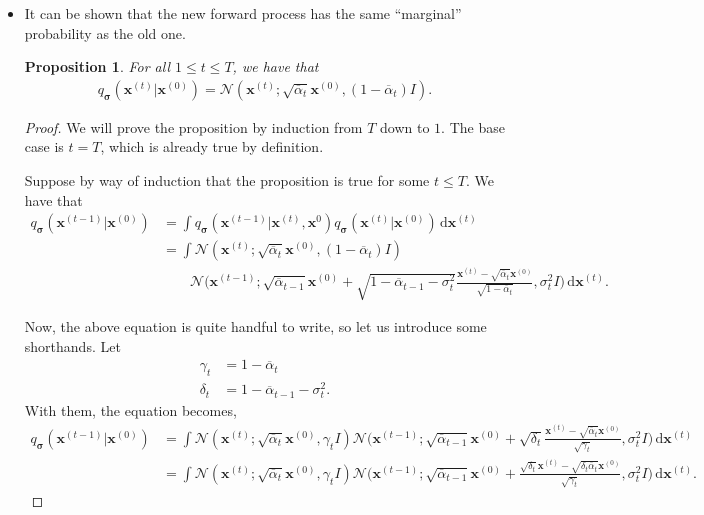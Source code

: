 \documentclass[10pt]{article}
\newtheorem{proposition}[lemma]{Proposition}
\newcommand{\dee}{\mathrm{d}}
\newcommand{\ve}[1]{\mathbf{#1}}
\newcommand{\ves}[1]{\boldsymbol{#1}}
\newcommand{\mcal}[1]{\mathcal{#1}}
\begin{document}
\begin{itemize}
  \item It can be shown that the new forward process has the same ``marginal'' probability as the old one.
  \begin{proposition}
    For all $1 \leq t \leq T$, we have that
    \begin{align*}
      q_{\ves{\sigma}}(\ve{x}^{(t)}|\ve{x}^{(0)}) = \mcal{N}(\ve{x}^{(t)}; \sqrt{\overline{\alpha}_t} \ve{x}^{(0)}, (1-\overline{\alpha}_t) I).
    \end{align*}
  \end{proposition}

  \begin{proof}
    We will prove the proposition by induction from $T$ down to $1$. The base case is $t = T$, which is already true by definition.

    Suppose by way of induction that the proposition is true for some $t \leq T$. We have that
    \begin{align*}
      q_{\ves{\sigma}}(\ve{x}^{(t-1)}|\ve{x}^{(0)}) 
      &= \int q_{\ves{\sigma}}(\ve{x}^{(t-1)}|\ve{x}^{(t)}, \ve{x}^{0}) q_{\ves{\sigma}}(\ve{x}^{(t)}|\ve{x}^{(0)})\, \dee\ve{x}^{(t)} \\
      &= \int \mcal{N}(\ve{x}^{(t)}; \sqrt{\overline{\alpha}_t} \ve{x}^{(0)}, (1-\overline{\alpha}_t) I) \\
      & \qquad \mcal{N}\bigg( \ve{x}^{(t-1)} ; \sqrt{\overline{\alpha}_{t-1}} \ve{x}^{(0)} + \sqrt{1 - \overline{\alpha}_{t-1} - \sigma_t^2 } \frac{\ve{x}^{(t)} - \sqrt{\overline{\alpha}_t} \ve{x}^{(0)}}{\sqrt{1 - \overline{\alpha}_t}}, \sigma_t^2 I \bigg)\, \dee\ve{x}^{(t)}.
    \end{align*}

    Now, the above equation is quite handful to write, so let us introduce some shorthands. Let
    \begin{align*}
      \gamma_t &= 1 - \overline{\alpha}_t \\
      \delta_t &= 1 - \overline{\alpha}_{t-1} - \sigma_t^2.
    \end{align*}
    With them, the equation becomes,
    \begin{align*}
      q_{\ves{\sigma}}(\ve{x}^{(t-1)}|\ve{x}^{(0)}) 
      &= \int \mcal{N}(\ve{x}^{(t)}; \sqrt{\overline{\alpha}_t} \ve{x}^{(0)}, \gamma_t I)
      \mcal{N}\bigg(\ve{x}^{(t-1)};\sqrt{\overline{\alpha}_{t-1}} \ve{x}^{(0)} + \sqrt{\delta_t}\frac{\ve{x}^{(t)} - \sqrt{\overline{\alpha}_t}\ve{x}^{(0)}}{\sqrt{\gamma_t}}, \sigma^2_t I \bigg)\, \dee \ve{x}^{(t)} \\
      &= \int \mcal{N}(\ve{x}^{(t)}; \sqrt{\overline{\alpha}_t} \ve{x}^{(0)}, \gamma_t I)
      \mcal{N}\bigg(\ve{x}^{(t-1)};\sqrt{\overline{\alpha}_{t-1}} \ve{x}^{(0)} + \frac{\sqrt{\delta_t}\ve{x}^{(t)} - \sqrt{\delta_t \overline{\alpha}_t}\ve{x}^{(0)}}{\sqrt{\gamma_t}}, \sigma^2_t I \bigg)\, \dee \ve{x}^{(t)}.
    \end{align*}


\end{proof}
\end{itemize}
\end{document}
